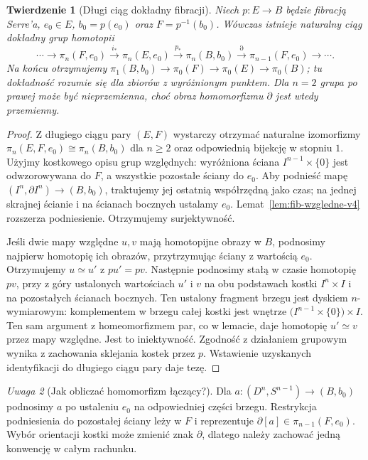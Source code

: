 \documentclass[11pt,a4paper,oneside]{report}
\theoremstyle{plain}
\newtheorem{twierdzenie}{Twierdzenie}[section]
\theoremstyle{definition}
\theoremstyle{remark}
\newtheorem{uwaga}[twierdzenie]{Uwaga}
\begin{document}
\begin{twierdzenie}[Długi ciąg dokładny fibracji]
\label{thm:fib-les-v4}
Niech $p:E\to B$ będzie fibracją Serre'a, $e_0\in E$,
$b_0=p(e_0)$ oraz $F=p^{-1}(b_0)$. Wówczas istnieje naturalny
ciąg dokładny grup homotopii
\[
\cdots\to\pi_n(F,e_0)\xrightarrow{i_*}\pi_n(E,e_0)
\xrightarrow{p_*}\pi_n(B,b_0)\xrightarrow{\partial}\pi_{n-1}(F,e_0)
\to\cdots.
\]
Na końcu otrzymujemy $\pi_1(B,b_0)\to\pi_0(F)\to\pi_0(E)\to\pi_0(B)$;
tu dokładność rozumie się dla zbiorów z wyróżnionym punktem.
Dla $n=2$ grupa po prawej może być nieprzemienna, choć obraz
homomorfizmu $\partial$ jest wtedy przemienny.
\end{twierdzenie}
\begin{proof}
Z długiego ciągu pary $(E,F)$ wystarczy otrzymać naturalne
izomorfizmy $\pi_n(E,F,e_0)\cong\pi_n(B,b_0)$ dla $n\ge2$
oraz odpowiednią bijekcję w stopniu $1$.
Użyjmy kostkowego opisu grup względnych: wyróżniona ściana
$I^{n-1}\times\{0\}$ jest odwzorowywana do $F$, a wszystkie
pozostałe ściany do $e_0$. Aby podnieść mapę
$(I^n,\partial I^n)\to(B,b_0)$, traktujemy jej ostatnią
współrzędną jako czas; na jednej skrajnej ścianie i na ścianach
bocznych ustalamy $e_0$. Lemat~\ref{lem:fib-wzgledne-v4}
rozszerza podniesienie. Otrzymujemy surjektywność.

Jeśli dwie mapy względne $u,v$ mają homotopijne obrazy w $B$,
podnosimy najpierw homotopię ich obrazów, przytrzymując ściany
z wartością $e_0$. Otrzymujemy $u\simeq u'$ z $pu'=pv$.
Następnie podnosimy stałą w czasie homotopię $pv$, przy
z góry ustalonych wartościach $u'$ i $v$ na obu podstawach
kostki $I^n\times I$ i na pozostałych ścianach bocznych.
Ten ustalony fragment brzegu jest dyskiem $n$-wymiarowym:
komplementem w brzegu całej kostki jest wnętrze
$\bigl(I^{n-1}\times\{0\}\bigr)\times I$. Ten sam argument
z homeomorfizmem par, co w lemacie, daje homotopię
$u'\simeq v$ przez mapy względne. Jest to iniektywność.
Zgodność z działaniem grupowym wynika z zachowania
sklejania kostek przez $p$. Wstawienie uzyskanych identyfikacji
do długiego ciągu pary daje tezę.
\end{proof}

\begin{uwaga}[Jak obliczać homomorfizm łączący?]
Dla $a:(D^n,S^{n-1})\to(B,b_0)$ podnosimy $a$ po
ustaleniu $e_0$ na odpowiedniej części brzegu. Restrykcja
podniesienia do pozostałej ściany leży w $F$ i reprezentuje
$\partial[a]\in\pi_{n-1}(F,e_0)$. Wybór orientacji kostki
może zmienić znak $\partial$, dlatego należy zachować
jedną konwencję w całym rachunku.
\end{uwaga}
\end{document}
